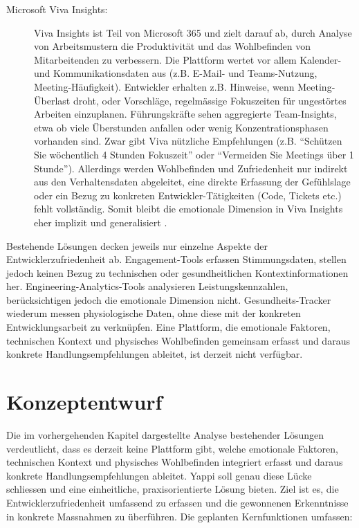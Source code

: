\documentclass[12pt,a4paper]{report}
\begin{document}
\begin{description}
  \item[Microsoft Viva Insights:] Viva Insights ist Teil von Microsoft 365 und zielt darauf ab, durch Analyse von Arbeitsmustern die
    Produktivität und das Wohlbefinden von Mitarbeitenden zu verbessern. Die Plattform wertet vor allem Kalender- und
    Kommunikationsdaten aus (z.B. E-Mail- und Teams-Nutzung, Meeting-Häufigkeit). Entwickler erhalten z.B. Hinweise, wenn
    Meeting-Überlast droht, oder Vorschläge, regelmässige Fokuszeiten für ungestörtes Arbeiten einzuplanen. Führungskräfte sehen
    aggregierte Team-Insights, etwa ob viele Überstunden anfallen oder wenig Konzentrationsphasen vorhanden sind. Zwar gibt Viva
    nützliche Empfehlungen (z.B. “Schützen Sie wöchentlich 4 Stunden Fokuszeit” oder “Vermeiden Sie Meetings über 1 Stunde”).
    Allerdings werden Wohlbefinden und Zufriedenheit nur indirekt aus den Verhaltensdaten abgeleitet, eine direkte Erfassung der
    Gefühlslage oder ein Bezug zu konkreten Entwickler-Tätigkeiten (Code, Tickets etc.) fehlt vollständig. Somit bleibt die
    emotionale Dimension in Viva Insights eher implizit und generalisiert \cite{zachminers_introduction_nodate}.
\end{description}

Bestehende Lösungen decken jeweils nur einzelne Aspekte der Entwicklerzufriedenheit ab. Engagement-Tools erfassen Stimmungsdaten,
stellen jedoch keinen Bezug zu technischen oder gesundheitlichen Kontextinformationen her. Engineering-Analytics-Tools analysieren
Leistungskennzahlen, berücksichtigen jedoch die emotionale Dimension nicht. Gesundheits-Tracker wiederum messen physiologische Daten,
ohne diese mit der konkreten Entwicklungsarbeit zu verknüpfen. Eine Plattform, die emotionale Faktoren, technischen Kontext und
physisches Wohlbefinden gemeinsam erfasst und daraus konkrete Handlungsempfehlungen ableitet, ist derzeit nicht verfügbar.

\chapter{Konzeptentwurf}

Die im vorhergehenden Kapitel dargestellte Analyse bestehender Lösungen verdeutlicht, dass es derzeit keine Plattform gibt, welche
emotionale Faktoren, technischen Kontext und physisches Wohlbefinden integriert erfasst und daraus konkrete Handlungsempfehlungen
ableitet. Yappi soll genau diese Lücke schliessen und eine einheitliche, praxisorientierte Lösung bieten. Ziel ist es, die
Entwicklerzufriedenheit umfassend zu erfassen und die gewonnenen Erkenntnisse in konkrete Massnahmen zu überführen. Die geplanten
Kernfunktionen umfassen:
\end{document}
